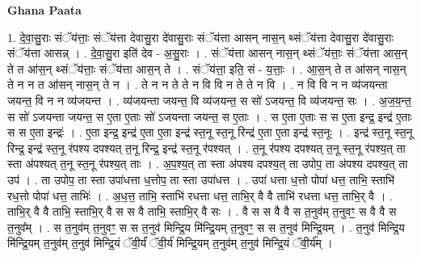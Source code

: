 \documentclass[17pt]{extarticle}
\begin{document}
\textbf{Ghana Paata } \newline

1. दे॒वा॒सु॒राः संॅय॑त्ताः॒ संॅय॑त्ता देवासु॒रा दे॑वासु॒राः संॅय॑त्ता आसन् नास॒न् थ्संॅय॑त्ता देवासु॒रा दे॑वासु॒राः संॅय॑त्ता आसन्न् । . दे॒वा॒सु॒रा इति॑ देव - अ॒सु॒राः । . संॅय॑त्ता आसन् नास॒न् थ्संॅय॑त्ताः॒ संॅय॑त्ता आस॒न् ते त आ॑स॒न् थ्संॅय॑त्ताः॒ संॅय॑त्ता आस॒न् ते । . संॅय॑त्ता॒ इति॒ सं - य॒त्ताः॒ । . आ॒स॒न् ते त आ॑सन् नास॒न् ते न न त आ॑सन् नास॒न् ते न । . ते न न ते ते न वि वि न ते ते न वि । . न वि वि न न व्य॑जयन्ता जयन्त॒ वि न न व्य॑जयन्त । . व्य॑जयन्ता जयन्त॒ वि व्य॑जयन्त॒ स सो॑ ऽजयन्त॒ वि व्य॑जयन्त॒ सः । . अ॒ज॒य॒न्त॒ स सो॑ ऽजयन्ता जयन्त॒ स ए॒ता ए॒ताः सो॑ ऽजयन्ता जयन्त॒ स ए॒ताः । . स ए॒ता ए॒ताः स स ए॒ता इन्द्र॒ इन्द्र॑ ए॒ताः स स ए॒ता इन्द्रः॑ । . ए॒ता इन्द्र॒ इन्द्र॑ ए॒ता ए॒ता इन्द्र॑ स्त॒नू स्त॒नू रिन्द्र॑ ए॒ता ए॒ता इन्द्र॑ स्त॒नूः । . इन्द्र॑ स्त॒नू स्त॒नू रिन्द्र॒ इन्द्र॑ स्त॒नू र॑पश्य दपश्यत् त॒नू रिन्द्र॒ इन्द्र॑ स्त॒नू र॑पश्यत् । . त॒नू र॑पश्य दपश्यत् त॒नू स्त॒नू र॑पश्य॒त् ता स्ता अ॑पश्यत् त॒नू स्त॒नू र॑पश्य॒त् ताः । . अ॒प॒श्य॒त् ता स्ता अ॑पश्य दपश्य॒त् ता उपोप॒ ता अ॑पश्य दपश्य॒त् ता उप॑ । . ता उपोप॒ ता स्ता उपा॑धत्ता ध॒त्तोप॒ ता स्ता उपा॑धत्त । . उपा॑ धत्ता ध॒त्तो पोपा॑ धत्त॒ ताभि॒ स्ताभि॑ रध॒त्तो पोपा॑ धत्त॒ ताभिः॑ । . अ॒ध॒त्त॒ ताभि॒ स्ताभि॑ रधत्ता धत्त॒ ताभि॒र् वै वै ताभि॑ रधत्ता धत्त॒ ताभि॒र् वै । . ताभि॒र् वै वै ताभि॒ स्ताभि॒र् वै स स वै ताभि॒ स्ताभि॒र् वै सः । . वै स स वै वै स त॒नुव॑म् त॒नुवꣳ॒॒ स वै वै स त॒नुव᳚म् । . स त॒नुव॑म् त॒नुवꣳ॒॒ स स त॒नुव॑ मिन्द्रि॒य मि॑न्द्रि॒यम् त॒नुवꣳ॒॒ स स त॒नुव॑ मिन्द्रि॒यम् । . त॒नुव॑ मिन्द्रि॒य मि॑न्द्रि॒यम् त॒नुव॑म् त॒नुव॑ मिन्द्रि॒यं ॅवी॒र्यं॑ ॅवी॒र्य॑ मिन्द्रि॒यम् त॒नुव॑म् त॒नुव॑ मिन्द्रि॒यं ॅवी॒र्य᳚म् । \newline
\end{document}
